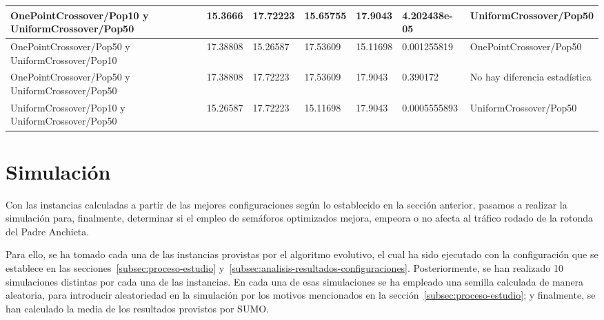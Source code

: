 \begin{table}
{\begin{tabular}{lllllll}
    OnePointCrossover/Pop10 y UniformCrossover/Pop50                    & 15.3666               & 17.72223              & 15.65755              & 17.9043               & 4.202438e-05                                          & UniformCrossover/Pop50                                \\ \hline
    OnePointCrossover/Pop50 y UniformCrossover/Pop10                    & 17.38808              & 15.26587              & 17.53609              & 15.11698              & 0.001255819                                           & OnePointCrossover/Pop50                               \\ \hline
    OnePointCrossover/Pop50 y UniformCrossover/Pop50                    & 17.38808              & 17.72223              & 17.53609              & 17.9043               & 0.390172                                              & No hay diferencia estadística                         \\ \hline
    UniformCrossover/Pop10 y UniformCrossover/Pop50                     & 15.26587              & 17.72223              & 15.11698              & 17.9043               & 0.0005555893                                          & UniformCrossover/Pop50                                \\ \hline
    \end{tabular}}
\end{table}


\section{Simulación}

Con las instancias calculadas a partir de las mejores configuraciones según lo establecido en la sección anterior, pasamos a realizar la simulación para, finalmente, determinar si el empleo de semáforos optimizados mejora, empeora o no afecta al tráfico rodado de la rotonda del Padre Anchieta.

Para ello, se ha tomado cada una de las instancias provistas por el algoritmo evolutivo, el cual ha sido ejecutado con la configuración que se establece en las secciones~\ref{subsec:proceso-estudio} y~\ref{subsec:analisis-resultados-configuraciones}. Posteriormente, se han realizado 10 simulaciones distintas por cada una de las instancias. En cada una de esas simulaciones se ha empleado una semilla calculada de manera aleatoria, para introducir aleatoriedad en la simulación por los motivos mencionados en la sección~\ref{subsec:proceso-estudio}; y finalmente, se han calculado la media de los resultados provistos por SUMO.

